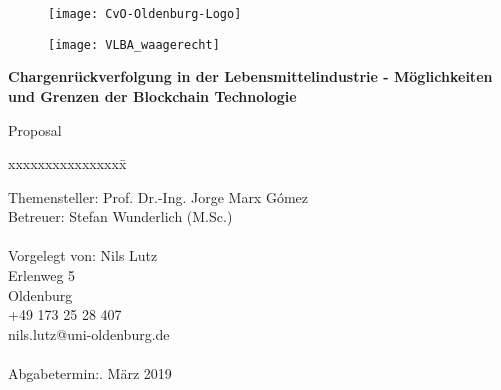 \begin{titlepage}
  \begin{centering}
  \begin{figure}[h!]
    \centering
    \texttt{[image: CvO-Oldenburg-Logo]}    %
  \end{figure}

  \vspace*{-0.8cm}

  \begin{figure}[h!]
    \centering
    \texttt{[image: VLBA\_waagerecht]}    %
  \end{figure}

  \vspace*{0.4cm}

  \textsf{\Huge \textbf{Chargenrückverfolgung in der Lebensmittelindustrie - Möglichkeiten und Grenzen der Blockchain Technologie\\}}

  \vspace*{0.5cm}
  \noindent Proposal\\

  \end{centering}

  \vspace*{1.5cm}
  \begin{tabbing}
  xxxxxxxxxxxxxxxx\= \kill

  \small Themensteller:\> Prof. Dr.-Ing. Jorge Marx Gómez\\
  \small Betreuer:\> Stefan Wunderlich (M.Sc.)\\\\

  \small Vorgelegt von: \>Nils Lutz\\
  \small \>Erlenweg 5\\
  \small {} Oldenburg\\
  \small \>+49 173 25 28 407\\
  \small \>nils.lutz@uni-oldenburg.de\\\\

  \small Abgabetermin:. März 2019
  \end{tabbing}
\end{titlepage}
\newpage

